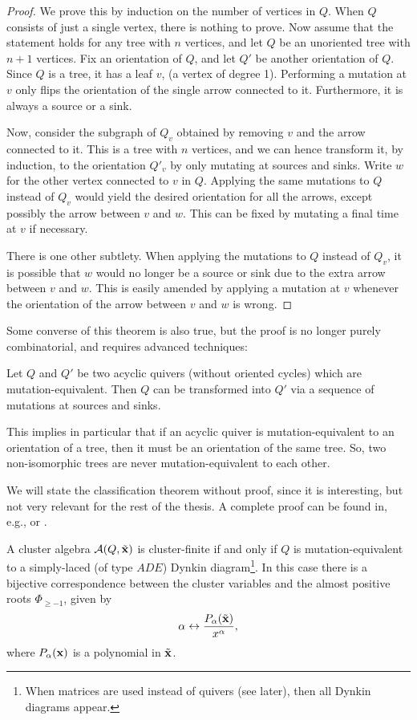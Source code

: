\begin{proof}
	We prove this by induction on the number of vertices in $Q$. When $Q$ consists of just a single vertex, there is nothing to prove. Now assume that the statement holds for any tree with $n$ vertices, and let $Q$ be an unoriented tree with $n+1$ vertices. Fix an orientation of $Q$, and let $Q'$ be another orientation of $Q$. Since $Q$ is a tree, it has a leaf $v$, (a vertex of degree 1). Performing a mutation at $v$ only flips the orientation of the single arrow connected to it. Furthermore, it is always a source or a sink.

	Now, consider the subgraph of $Q_v$ obtained by removing $v$ and the arrow connected to
	it. This is a tree with $n$ vertices, and we can hence transform it, by induction, to
	the orientation $Q'_v$ by only mutating at sources and sinks. Write $w$ for the other
	vertex connected to $v$ in $Q$. Applying the same mutations to $Q$ instead of $Q_v$
	would yield the desired orientation for all the arrows, except possibly the arrow
	between $v$ and $w$. This can be fixed by mutating a final time at $v$ if necessary.

	There is one other subtlety. When applying the mutations to $Q$ instead of $Q_v$, it is
	possible that $w$ would no longer be a source or sink due to the extra arrow between
	$v$ and $w$. This is easily amended by applying a mutation at $v$ whenever the
	orientation of the arrow between $v$ and $w$ is wrong.
\end{proof}
Some converse of this theorem is also true, but the proof is no longer purely combinatorial, and requires advanced techniques:
\begin{theorem}
	Let $Q$ and $Q'$ be two acyclic quivers (without oriented cycles) which are mutation-equivalent. Then $Q$ can be transformed into $Q'$ via a sequence of mutations at sources and sinks.
\end{theorem}
This implies in particular that if an acyclic quiver is mutation-equivalent to an
orientation of a tree, then it must be an orientation of the same tree. So, two
non-isomorphic trees are never mutation-equivalent to each other.

We will state the classification theorem without proof, since it is interesting, but
not very relevant for the rest of the thesis. A complete proof can be found in, e.g.,
\cite{FominZelevinsky2003CAFin} or \cite{FominWilliams2021IntroductionCA_4-5}.
\begin{theorem}
	A cluster algebra $\mathcal{A} (Q, \tilde{\mathbf{x}})$ is cluster-finite if and only if $Q$ is
	mutation-equivalent to a simply-laced (of type $ADE$) Dynkin diagram\footnote{When matrices are used instead of quivers (see later), then all Dynkin diagrams appear.}. In this case there is a bijective correspondence between the cluster variables and the almost positive roots $\Phi_{\geq -1}$, given by
	\begin{equation*}
		\alpha \leftrightarrow \frac{P_\alpha (\tilde{\mathbf{x}})}{x^\alpha},
	\end{equation*}
	where $P_\alpha (\mathbf{x})$ is a polynomial in $\tilde{\mathbf{x}}$.
\end{theorem}

